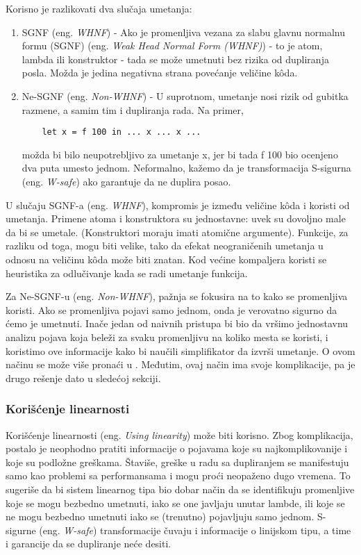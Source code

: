 Korisno je razlikovati dva slučaja umetanja:
\begin{enumerate}
	\item SGNF (eng. \emph{WHNF}) - Ako je promenljiva vezana za slabu glavnu normalnu formu (SGNF) (eng. \emph{Weak Head Normal Form (WHNF)}) - to 
	je atom, lambda ili konstruktor - tada se može umetnuti bez rizika od dupliranja posla. Možda je jedina negativna 
	strana povećanje veličine k\^{o}da.
	\item Ne-SGNF (eng. \emph{Non-WHNF}) - U suprotnom, umetanje nosi rizik od gubitka razmene, a samim tim i dupliranja rada. Na primer,
	\begin{verbatim}
	let x = f 100 in ... x ... x ... 
	\end{verbatim}
	možda bi bilo neupotrebljivo za umetanje x, jer bi tada f 100 bio ocenjeno dva puta 
	umesto jednom. Neformalno, kažemo da je transformacija S-sigurna (eng. \emph{W-safe}) ako garantuje da ne duplira posao.
\end{enumerate}

U slučaju SGNF-a (eng. \emph{WHNF}), kompromis je između veličine k\^{o}da i koristi od umetanja. Primene atoma i konstruktora su 
jednostavne: uvek su dovoljno male da bi se umetale. (Konstruktori moraju imati atomične argumente). Funkcije, za razliku od toga, mogu biti velike, tako da efekat neograničenih umetanja u odnosu na veličinu k\^{o}da može biti znatan. Kod većine kompaljera koristi se heuristika za odlučivanje kada se radi umetanje funkcija.

Za Ne-SGNF-u (eng. \emph{Non-WHNF}), pažnja se fokusira na to kako se promenljiva koristi. Ako se promenljiva 
pojavi samo jednom, onda je verovatno sigurno da ćemo je umetnuti. Inače jedan od naivnih pristupa bi bio da vršimo jednostavnu analizu pojava koja 
beleži za svaku promenljivu na koliko mesta se koristi, i koristimo ove informacije kako bi naučili simplifikator da izvrši umetanje. O ovom načinu se može više pronaći u \cite{appel}. Međutim, ovaj način ima svoje komplikacije, pa je drugo rešenje dato u sledećoj sekciji.

\subsubsection{Korišćenje linearnosti}
\label{sec:podpodnaslovLinearity}

Korišćenje linearnosti (eng. \emph{Using linearity}) može biti korisno. Zbog komplikacija, postalo je neophodno pratiti informacije o pojavama koje su najkomplikovanije i koje su podložne greškama. Štaviše, 
greške u radu sa dupliranjem se manifestuju samo kao problemi sa performansama i mogu proći neopaženo dugo vremena. To sugeriše da bi sistem linearnog tipa bio dobar način da se identifikuju promenljive koje se mogu bezbedno umetnuti, iako se one javljaju unutar lambde, ili koje se ne mogu bezbedno umetnuti iako se (trenutno) pojavljuju samo jednom. S-sigurne (eng. \emph{W-safe}) transformacije čuvaju i informacije o linijskom tipu, a time i garancije da se dupliranje neće desiti.

